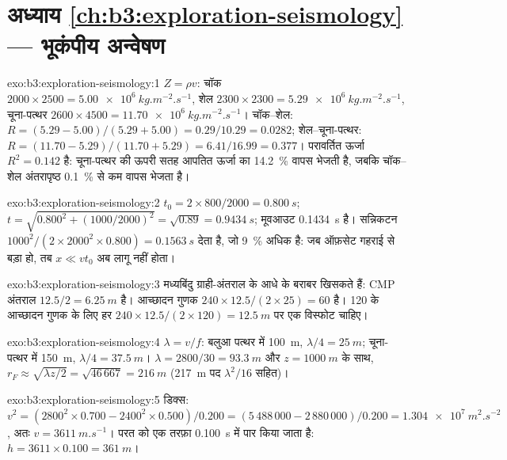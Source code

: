 \section*{अध्याय \ref{ch:b3:exploration-seismology} --- भूकंपीय अन्वेषण}

\begin{solution}{exo:b3:exploration-seismology:1}
$Z = \rho v$: चॉक $2000\times2500 = \qty{5.00e6}{kg.m^{-2}.s^{-1}}$, शेल
$2300\times2300 = \qty{5.29e6}{kg.m^{-2}.s^{-1}}$, चूना-पत्थर $2600\times4500 =
\qty{11.70e6}{kg.m^{-2}.s^{-1}}$। चॉक--शेल: $R = (5.29 - 5.00)/(5.29 + 5.00)
= 0.29/10.29 = 0.0282$; शेल--चूना-पत्थर: $R = (11.70 - 5.29)/(11.70 + 5.29) =
6.41/16.99 = 0.377$। परावर्तित ऊर्जा $R^2 = 0.142$ है: चूना-पत्थर की ऊपरी सतह
आपतित ऊर्जा का \qty{14.2}{\percent} वापस भेजती है, जबकि चॉक--शेल
अंतरापृष्ठ \qty{0.1}{\percent} से कम वापस भेजता है।
\end{solution}

\begin{solution}{exo:b3:exploration-seismology:2}
$t_0 = 2\times800/2000 = \qty{0.800}{s}$; $t = \sqrt{0.800^2 + (1000/2000)^2} =
\sqrt{0.89} = \qty{0.9434}{s}$; मूवआउट \qty{0.1434}{s} है। सन्निकटन
$1000^2/(2\times2000^2\times0.800) = \qty{0.1563}{s}$ देता है, जो
\qty{9}{\percent} अधिक है: जब ऑफ़सेट गहराई से बड़ा हो, तब $x \ll vt_0$
अब लागू नहीं होता।
\end{solution}

\begin{solution}{exo:b3:exploration-seismology:3}
मध्यबिंदु ग्राही-अंतराल के आधे के बराबर खिसकते हैं: CMP अंतराल
$12.5/2 = \qty{6.25}{m}$ है। आच्छादन गुणक $240\times12.5/(2\times25) = 60$ है।
120 के आच्छादन गुणक के लिए हर $240\times12.5/(2\times120) = \qty{12.5}{m}$ पर एक विस्फोट चाहिए।
\end{solution}

\begin{solution}{exo:b3:exploration-seismology:4}
$\lambda = v/f$: बलुआ पत्थर में \qty{100}{m}, $\lambda/4 = \qty{25}{m}$;
चूना-पत्थर में \qty{150}{m}, $\lambda/4 = \qty{37.5}{m}$। $\lambda = 2800/30 = \qty{93.3}{m}$ और
$z = \qty{1000}{m}$ के साथ,
$r_F \approx \sqrt{\lambda z/2} = \sqrt{46\,667} = \qty{216}{m}$ (\qty{217}{m}
पद $\lambda^2/16$ सहित)।
\end{solution}

\begin{solution}{exo:b3:exploration-seismology:5}
डिक्स: $v^2 = (2800^2\times0.700 - 2400^2\times0.500)/0.200 = (5\,488\,000 -
2\,880\,000)/0.200 = \qty{1.304e7}{m^2.s^{-2}}$, अतः $v = \qty{3611}{m.s^{-1}}$।
परत को एक तरफ़ा \qty{0.100}{s} में पार किया जाता है: $h = 3611\times0.100 =
\qty{361}{m}$।
\end{solution}

